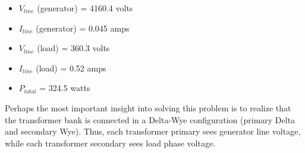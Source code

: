 \vskip 10pt

\begin{itemize}
\item{} $V_{line}$ (generator) = 4160.4 volts
\item{} $I_{line}$ (generator) = 0.045 amps
\item{} $V_{line}$ (load) = 360.3 volts
\item{} $I_{line}$ (load) = 0.52 amps
\item{} $P_{total}$ = 324.5 watts
\end{itemize}

Perhaps the most important insight into solving this problem is to realize that the transformer bank is connected in a Delta-Wye configuration (primary Delta and secondary Wye).  Thus, each transformer primary sees generator line voltage, while each transformer secondary sees load phase voltage.




